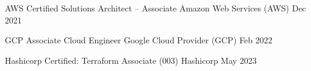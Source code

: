 

\begin{cvhonors}

  \cvhonor
    {AWS Certified Solutions Architect – Associate} %
    {Amazon Web Services (AWS)} %
    {} %
    {Dec 2021} %

  \cvhonor
    {GCP Associate Cloud Engineer} %
    {Google Cloud Provider (GCP)} %
    {} %
    {Feb 2022} %

  \cvhonor
    {Hashicorp Certified: Terraform Associate (003)} %
    {Hashicorp} %
    {} %
    {May 2023} %

\end{cvhonors}
